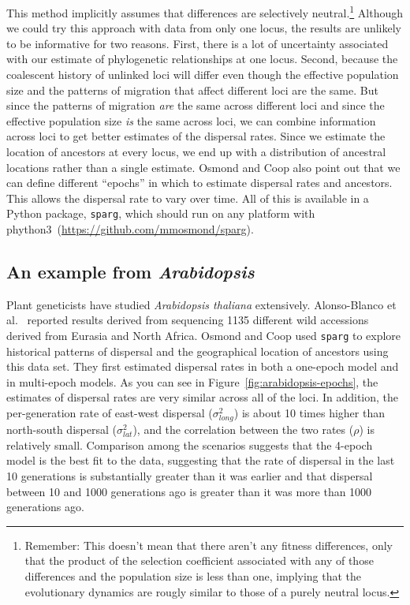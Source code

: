 \documentclass[12pt]{article}
\begin{document}
This method implicitly assumes that differences are selectively
neutral.\footnote{Remember: This doesn't mean that there aren't any
  fitness differences, only that the product of the selection
  coefficient associated with any of those differences and the
  population size is less than one, implying that the evolutionary
  dynamics are rougly similar to those of a purely neutral locus.}
Although we could try this approach with data from only one locus, the
results are unlikely to be informative for two reasons. First, there
is a lot of uncertainty associated with our estimate of phylogenetic
relationships at one locus. Second, because the coalescent history of
unlinked loci will differ even though the effective population size
and the patterns of migration that affect different loci are the
same. But since the patterns of migration {\it are\/} the same across
different loci and since the effective population size {\it is\/} the
same across loci, we can combine information across loci to get better
estimates of the dispersal rates. Since we estimate the location of
ancestors at every locus, we end up with a distribution of ancestral
locations rather than a single estimate. Osmond and Coop also point
out that we can define different ``epochs'' in which to estimate
dispersal rates and ancestors. This allows the dispersal rate to vary
over time. All of this is available in a Python package, {\tt sparg},
which should run on any platform with
phython3~(\url{https://github.com/mmosmond/sparg}).

\subsection*{An example from {\it Arabidopsis}} 

Plant geneticists have studied {\it Arabidopsis thaliana\/}
extensively. Alonso-Blanco et al.~\cite{AlonsoBlanco-etal-2016}
reported results derived from sequencing 1135 different wild
accessions derived from Eurasia and North Africa. Osmond and Coop used
{\tt sparg} to explore historical patterns of dispersal and the
geographical location of ancestors using this data set. They first
estimated dispersal rates in both a one-epoch model and in multi-epoch
models. As you can see in Figure~\ref{fig:arabidopsis-epochs}, the
estimates of dispersal rates are very similar across all of the
loci. In addition, the per-generation rate of east-west dispersal
($\sigma^2_{long}$) is about 10 times higher than north-south
dispersal ($\sigma^2_{lat}$), and the correlation between the two
rates ($\rho$) is relatively small. Comparison among the scenarios
suggests that the 4-epoch model is the best fit to the data,
suggesting that the rate of dispersal in the last 10 generations is
substantially greater than it was earlier and that dispersal between
10 and 1000 generations ago is greater than it was more than 1000
generations ago.
\end{document}
